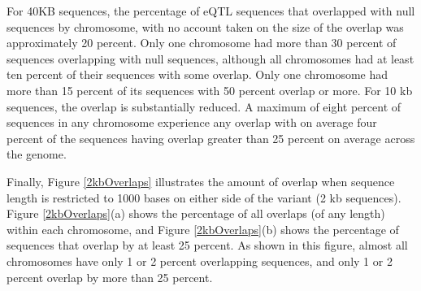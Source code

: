 \documentclass[12pt]{article}
\begin{document}
For 40KB sequences, the percentage of eQTL sequences that overlapped with null sequences by chromosome, with no account taken on the size of the overlap 
was approximately 20 percent. Only one chromosome had more than 30 percent of sequences overlapping with null sequences, although all chromosomes had at least ten percent of their sequences with some overlap. Only one chromosome had more than 15 percent of its sequences with 50 percent overlap or more. For 10 kb sequences, the overlap is substantially reduced. A maximum of eight percent of sequences in any chromosome experience any overlap with on average 
four percent of the sequences having overlap greater than 25 percent on average across the genome.

Finally, Figure \ref{2kbOverlaps} illustrates the amount of overlap when sequence length is restricted to 1000 bases on either side of the variant (2 kb sequences). Figure \ref{2kbOverlaps}(a) shows the percentage of all overlaps (of any length) within each chromosome, and Figure \ref{2kbOverlaps}(b) shows the percentage of sequences that overlap by at least 25 percent. As shown in this figure, almost all chromosomes have only 1 or 2 percent overlapping sequences, and only 1 or 2 percent overlap by more than 25 percent.
\end{document}
